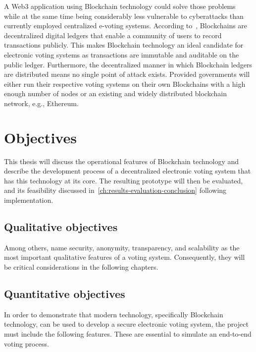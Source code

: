 A \Gls{Web3} application using \gls{Blockchain} technology could solve those problems while at the same time being considerably less vulnerable to cyberattacks than currently employed centralized e-voting systems.
According to~\textcite{yaga_blockchain_2018}, \glspl{Blockchain} are decentralized digital ledgers that enable a community of users to record transactions publicly.
This makes \gls{Blockchain} technology an ideal candidate for electronic voting systems as transactions are immutable and auditable on the public ledger.
Furthermore, the decentralized manner in which \gls{Blockchain} ledgers are distributed means no single point of attack exists.
Provided governments will either run their respective voting systems on their own \glspl{Blockchain} with a high enough number of nodes or an existing and widely distributed blockchain network, e.g., Ethereum.

\section{Objectives}\label{sec:objectives}

This thesis will discuss the operational features of \gls{Blockchain} technology and describe the development process of a decentralized electronic voting system that has this technology at its core.
The resulting prototype will then be evaluated, and its feasibility discussed in~\cref{ch:results-evaluation-conclusion} following implementation.

\subsection{Qualitative objectives}\label{subsec:qualitative-objectives}

Among others, \textcites[9-11]{jafar_blockchain_2021}[3]{diaz-santiso_e-voting_2021}{lowry_desirable_2009}[10-12]{tas_systematic_2020} name security, anonymity, transparency, and scalability as the most important qualitative features of a voting system.
Consequently, they will be critical considerations in the following chapters.

\subsection{Quantitative objectives}\label{subsec:quantitative-objectives}

In order to demonstrate that modern technology, specifically \gls{Blockchain} technology, can be used to develop a secure electronic voting system, the project must include the following features.
These are essential to simulate an end-to-end voting process.

